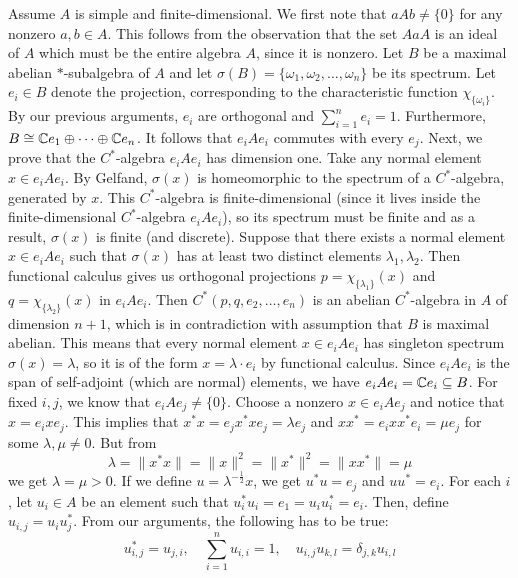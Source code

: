 \begin{myproof}
  Assume $A$ is simple and finite-dimensional. We first note that $aA b \neq \{0\}$ for any nonzero $a, b \in A$.
  This follows from the observation that the set $A aA$ is an ideal of $A$ which must be the entire algebra $A$,
  since it is nonzero. Let $B$ be a maximal abelian $*$-subalgebra of $A$ and let $\sigma(B) = \{\omega_1, \omega_2, \dots, \omega_n\}$
  be its spectrum. Let $e_i \in B$ denote the projection, corresponding to the characteristic function $\chi_{\{\omega_i\}}$.
  By our previous arguments, $e_i$ are orthogonal and $\sum_{i = 1} ^n e_i = 1$.
  Furthermore, $B \cong \mathbb {C} e_1 \oplus \dots \oplus \mathbb {C} e_n$. It follows that $e_i A e_i$ commutes with every $e_j$.
  Next, we prove that the $C^*$-algebra $e_i A e_i$ has dimension one. 
  Take any normal element $x \in e_i A e_i$.
  By Gelfand, $\sigma(x)$ is homeomorphic to the spectrum of a $C^*$-algebra, generated by $x$.
  This $C^*$-algebra is finite-dimensional (since it lives inside the finite-dimensional $C^*$-algebra $e_i A e_i$),
  so its spectrum must be finite and as a result, $\sigma(x)$ is finite (and discrete). 
  Suppose that there exists a normal element $x \in e_i A e_i$ such that $\sigma(x)$ has at least two distinct elements $\lambda_1, \lambda_2$.
  Then functional calculus gives us orthogonal projections $p = \chi_{\{\lambda_1\}} (x)$ and $q = \chi_{\{\lambda_2\}} (x)$ in $e_i A e_i$.
  Then $C^* (p, q, e_2, \dots, e_n)$ is an abelian $C^*$-algebra in $A$ of dimension $n + 1$, which is in contradiction with assumption that 
  $B$ is maximal abelian. This means that every normal element $x \in e_i A e_i$
  has singleton spectrum $\sigma(x) = \lambda$, so it is of the form $x = \lambda \cdot e_i$ by functional calculus.
  Since $e_i A e_i$ is the span of self-adjoint (which are normal) elements, we have $e_i A e_i = \mathbb {C} e_i \subseteq B$.
  For fixed $i, j$, we know that $e_i A e_j \neq \{0\}$.
  Choose a nonzero $x \in e_i A e_j$ and notice that $x = e_i x e_j$.
  This implies that $x^* x = e_j x^* x e_j = \lambda e_j$ and 
  $x x^* = e_i x x^* e_i = \mu e_j$ for some $\lambda, \mu \neq 0.$
  But from $$\lambda = \| x^* x\| = \|x\|^2 = \|x^*\|^2 = \| x x^*\| = \mu$$
  we get $\lambda = \mu > 0$. If we define $u = \lambda^{-\frac{1}{2}} x$, we get 
  $u^* u = e_j$ and $u u^* = e_i$. For each $i$, let $u_i \in A$ be an element such that 
  $u_i^* u_i = e_1 = u_i u_i^* = e_i$. Then, define $u_{i, j} = u_i u_j^*$.
  From our arguments, the following has to be true:
  $$u_{i, j}^* = u_{j, i},\quad \sum_{i = 1} ^n u_{i, i} = 1,\quad u_{i, j} u_{k, l} = \delta_{j, k} u_{i, l}$$

\end{myproof}

